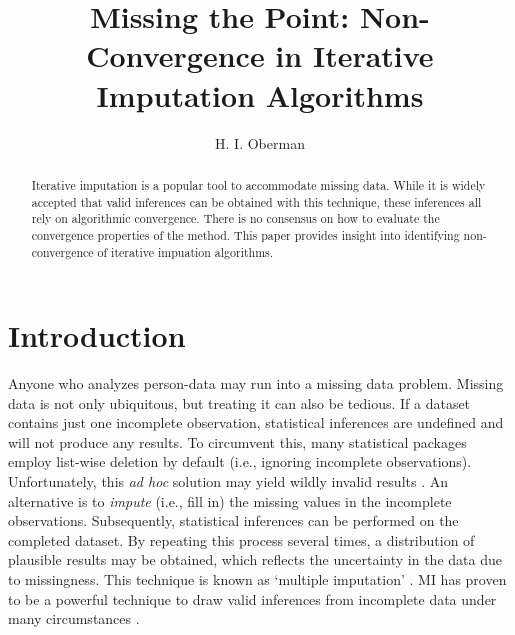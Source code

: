 \documentclass[Royal,times,sageh]{sagej}
\begin{document}
\title{Missing the Point: Non-Convergence in Iterative Imputation Algorithms}


\author{H. I. Oberman}




\begin{abstract}
Iterative imputation is a popular tool to accommodate missing data. While it is widely accepted that valid inferences can be obtained with this technique, these inferences all rely on algorithmic convergence. There is no consensus on how to evaluate the convergence properties of the method. This paper provides insight into identifying non-convergence of iterative impuation algorithms.
\end{abstract}


\maketitle

\hypertarget{introduction}{%
\section{Introduction}\label{introduction}}

Anyone who analyzes person-data may run into a missing data problem. Missing data is not only ubiquitous, but treating it can also be tedious. If a dataset contains just one incomplete observation, statistical inferences are undefined and will not produce any results. To circumvent this, many statistical packages employ list-wise deletion by default (i.e., ignoring incomplete observations). Unfortunately, this \emph{ad hoc} solution may yield wildly invalid results \citep{buur18}. An alternative is to \emph{impute} (i.e., fill in) the missing values in the incomplete observations. Subsequently, statistical inferences can be performed on the completed dataset. By repeating this process several times, a distribution of plausible results may be obtained, which reflects the uncertainty in the data due to missingness. This technique is known as `multiple imputation' \citep[MI;][]{rubin76}. MI has proven to be a powerful technique to draw valid inferences from incomplete data under many circumstances \citep{buur18}.
\end{document}
